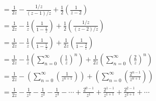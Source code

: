 \begin{problema}
\begin{enumerate}
\begin{sol}
\begin{align*}
                &=\frac{1}{2z}-\frac{1\big/ z}{(z-1)\big/ z}+\frac{1}{2}\left(\frac{1}{z-2}\right)\\
                &=\frac{1}{2z}-\frac{1}{z}\left(\frac{1}{1-\frac{1}{z}}\right)+\frac{1}{2}\left(\frac{1\big/ z}{(z-2)\big/ z}\right)\\
                &=\frac{1}{2z}-\frac{1}{z}\left(\frac{1}{1-\frac{1}{z}}\right)+\frac{1}{2z}\left(\frac{1}{1-\frac{2}{z}}\right)\\
                &=\frac{1}{2z}-\frac{1}{z}\left(\sum_{n=0}^\infty\left(\frac{1}{z}\right)^n\right)+\frac{1}{2z}\left(\sum_{n=0}^\infty\left(\frac{2}{z}\right)^n\right)\\
                &=\frac{1}{2z}-\left(\sum_{n=0}^\infty\left(\frac{1}{z^{n+1}}\right)\right)+\left(\sum_{n=0}^\infty\left(\frac{2^{n-1}}{z^{n+1}}\right)\right)\\
                &= \frac{1}{2z}-\frac{1}{z^1}-\frac{1}{z^2}-\frac{1}{z^3}-\cdots +\frac{2^{0-1}}{z^{1}}+\frac{2^{1-1}}{z^{1+1}}+\frac{2^{2-1}}{z^{2+1}}+\cdots
            \end{align*}
        \end{sol}
    \end{enumerate}

\end{problema}

